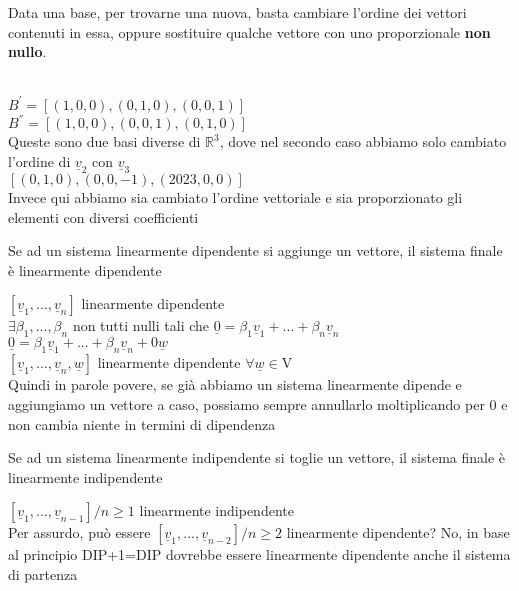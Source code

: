   Data una base, per trovarne una nuova, basta cambiare l'ordine dei
  vettori contenuti in essa, oppure sostituire qualche vettore con
  uno proporzionale \textbf{non nullo}.

  \begin{es}
    \phantom{}\\
    $B^{'}=[(1,0,0),(0,1,0),(0,0,1)]$\\
    $B^{''}=[(1,0,0),(0,0,1),(0,1,0)]$\\
    Queste sono due basi diverse di $\mathbb{R}^3$, dove nel secondo
    caso abbiamo solo cambiato l'ordine di $\underline{v}_2$ con
    $\underline{v}_3$\\
    $[(0,1,0),(0,0,-1),(2023,0,0)]$\\
    Invece qui abbiamo sia cambiato l'ordine vettoriale e sia
    proporzionato gli elementi con diversi coefficienti
  \end{es}

  \begin{nota}[DIP+1=DIP]
    Se ad un sistema linearmente dipendente si aggiunge un vettore,
    il sistema finale è linearmente dipendente
    \begin{dimostrazione}
      $[\underline{v}_1,...,\underline{v}_n]$ linearmente dipendente\\
      $\exists\beta_1,...,\beta_n$ non tutti nulli tali che
      $\underline{0}=\beta_1\underline{v}_1+...+\beta_n\underline{v}_n$\\
      $\underline{0}=\beta_1\underline{v}_1+...+\beta_n\underline{v}_n+0\underline{w}$\\
      $[\underline{v}_1,...,\underline{v}_n,\underline{w}]$
      linearmente dipendente $\forall\underline{w}\in$V\\
      Quindi in parole povere, se già abbiamo un sistema linearmente
      dipende e aggiungiamo un vettore a caso, possiamo sempre
      annullarlo moltiplicando per 0 e non cambia niente in termini
      di dipendenza
    \end{dimostrazione}
  \end{nota}

  \begin{nota}[INDIP-1=INDIP]
    Se ad un sistema linearmente indipendente si toglie un vettore,
    il sistema finale è linearmente indipendente
    \begin{dimostrazione}
      $[\underline{v}_1,...,\underline{v}_{n-1}]/n\geq 1$ linearmente
      indipendente\\
      Per assurdo, può essere
      $[\underline{v}_1,...,\underline{v}_{n-2}]/n\geq 2$ linearmente
      dipendente? No, in base al principio DIP+1=DIP dovrebbe essere
      linearmente dipendente anche il sistema di partenza
    \end{dimostrazione}
  \end{nota}

